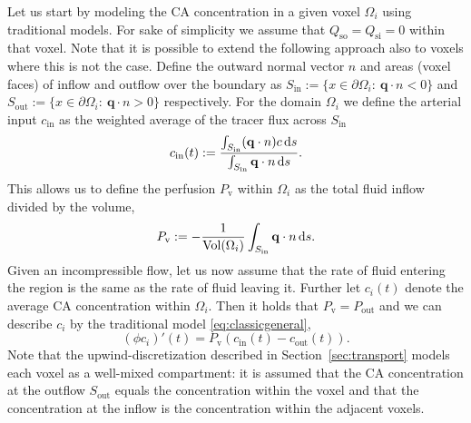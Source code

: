 \documentclass[journal,twocolumn]{IEEEtran}
\newcommand{\Perfv}{P_{\mathrm{v}}}
\newcommand{\vq}{\mathbf{q}}
\begin{document}
	Let us start by modeling the CA concentration in a given voxel $\Omega_i$ using traditional models.
	For sake of simplicity we assume that $Q_{\mathrm{so}} = Q_{\mathrm{si}} = 0$ within that voxel.
	Note that it is possible to extend the following approach also to voxels where this is not the case.
	Define the outward normal vector $n$ and areas (voxel faces) of inflow and outflow over the boundary as $S_{\mathrm{in}} := \{ x \in \partial \Omega_i: \ \vq \cdot n < 0 \}$ and $S_{\mathrm{out}}:= \{ x \in \partial \Omega_i: \ \vq \cdot n > 0 \}$ respectively.
	For the domain $\Omega_i$ we define the arterial input $c_{\mathrm{in}}$ as the weighted average of the tracer flux across $S_{\mathrm{in}}$
	\begin{equation}\label{eq:cin}
	 	c_{\mathrm{in}}(t):= \frac{\int_{S_{\mathrm{in}}}(\vq \cdot n)c \diffint s}{\int_{S_{\mathrm{in}}} \vq \cdot n \diffint s}.
	\end{equation}
	This allows us to define the perfusion $\Perfv$ within $\Omega_i$ as the total fluid inflow divided by the volume,
	\begin{equation}\label{eq:perflocal}
		\Perfv :=-\frac{1}{\mathrm{Vol}( \Omega_i)}\int_{S_{\mathrm{in}}} \vq \cdot n \diffint s.
	\end{equation}
	Given an incompressible flow, let us now assume that the rate of fluid entering the region is the same as the rate of fluid leaving it. 
	Further let $c_i(t)$ denote the average CA concentration within $\Omega_i$.
	Then it holds that $\Perfv=P_{\mathrm{out}}$ and we can describe $c_i$ by the traditional model \eqref{eq:classicgeneral},
	\begin{equation}\label{eq:singlevoxel}
		(\phi c_i)'(t)  = \Perfv (c_\mathrm{in}(t)  - c_\mathrm{out}(t)).
	\end{equation}
	Note that the upwind-discretization described in Section~\ref{sec:transport} models each voxel as a well-mixed compartment: it is assumed that the CA concentration at the outflow $S_\mathrm{out}$ equals the concentration within the voxel and that the concentration at the inflow is the concentration within the adjacent voxels.

\end{document}
